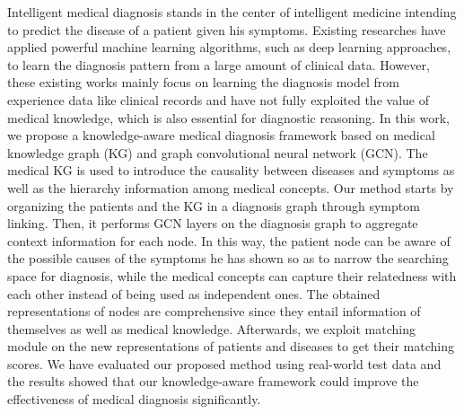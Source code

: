Intelligent medical diagnosis stands in the center of intelligent medicine intending to predict the disease of a patient given his symptoms.
Existing researches have applied powerful machine learning algorithms, such as deep learning approaches, to learn the diagnosis pattern from a large amount of clinical data.
However, these existing works mainly focus on learning the diagnosis model from experience data like clinical records and have not fully exploited the value of medical knowledge, which is also essential for diagnostic reasoning.
In this work, we propose a knowledge-aware medical diagnosis framework based on medical knowledge graph (KG) and graph convolutional neural network (GCN).
The medical KG is used to introduce the causality between diseases and symptoms as well as the hierarchy information among medical concepts.
Our method starts by organizing the patients and the KG in a diagnosis graph through symptom linking.
Then, it performs GCN layers on the diagnosis graph to aggregate context information for each node. 
In this way, the patient node can be aware of the possible causes of the symptoms he has shown so as to narrow the searching space for diagnosis, while the medical concepts can capture their relatedness with each other instead of being used as independent ones.
The obtained representations of nodes are comprehensive since they entail information of themselves as well as medical knowledge.
Afterwards, we exploit matching module on the new representations of patients and diseases to get their matching scores.
We have evaluated our proposed method using real-world test data and the results showed that our knowledge-aware framework could improve the effectiveness of medical diagnosis significantly.




